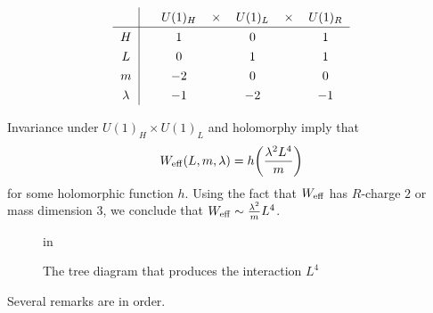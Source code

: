 \documentclass[lecture]{qft-l}
\newcommand{\lam}{\lambda}
\newcommand{\bef}{\begin{figure}[h]
		\vspace{3ex}}
\newcommand{\enf}{\end{figure}}
\newcommand{\eff}{_{{\rm eff}}}
\numberwithin{figure}{chapter}
\begin{document}
\bigskip
\begin{equation}
\renewcommand{\arraystretch}{1.3}
\begin{tabular}{c|cccccc}
&& $U(1)_H$ &$\times$&   $U(1)_L$ &$\times$&  $U(1)_R$	\\
	\hline
$H$ &&   $1$& &  $0$ &&    $1$	\\
$L$	&&      $0$	&	&     $1$	&	& $1$	\\
$m$	&&     $-2$	&	&     $0$	&	& $0$	\\
$\lam$	&&     $-1$	&	&     $-2$	&	& $-1$	
\end{tabular}
\end{equation}

\bigskip\noindent
Invariance under $U(1)_H\times U(1)_L$ and holomorphy imply that
	\begin{equation}
W\eff(L,m,\lam)=h\!\left(\frac{\lam^2L^4}{m}\right)
	\end{equation}
for some holomorphic function $h$.
Using the fact that $W\eff$ has $R$-charge $2$ 
or mass dimension $3$,
we conclude that $W\eff\sim\frac{\lam^2}{m}L^4$.

	\bef
{} in
\centerline{}
\caption{\protect\label{HL}The tree diagram that produces the 
interaction $L^4$}
	\enf

Several remarks are in order.
\end{document}
